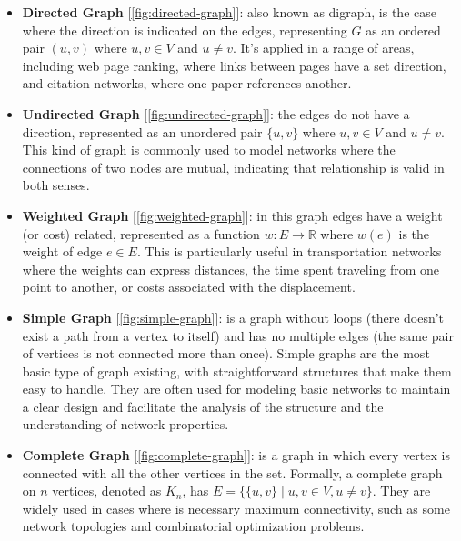 \documentclass[../Thesis.tex]{subfiles}
\begin{document}
	\begin{itemize}
		\item \textbf{Directed Graph} [\autoref{fig:directed-graph}]: also known as digraph, is the case where the direction is indicated on the edges, representing \( G \) as an ordered pair \( (u, v) \) where \( u, v \in V \) and \( u \neq v \). It's applied in a range of areas, including web page ranking, where links between pages have a set direction, and citation networks, where one paper references another.
		
		
		\item \textbf{Undirected Graph} [\autoref{fig:undirected-graph}]: the edges do not have a direction, represented as an unordered pair \( \{u, v\} \) where \( u, v \in V \) and \( u \neq v \). This kind of graph is commonly used to model networks where the connections of two nodes are mutual, indicating that relationship is valid in both senses.
		
		
		\item \textbf{Weighted Graph} [\autoref{fig:weighted-graph}]: in this graph edges have a weight (or cost) related, represented as a function \( w: E \to \mathbb{R} \) where \( w(e) \) is the weight of edge \( e \in E \). This is particularly useful in transportation networks where the weights can express distances, the time spent traveling from one point to another, or costs associated with the displacement.
		
		
		\item \textbf{Simple Graph} [\autoref{fig:simple-graph}]: is a graph without loops (there doesn't exist a path from a vertex to itself) and has no multiple edges (the same pair of vertices is not connected more than once). Simple graphs are the most basic type of graph existing, with straightforward structures that make them easy to handle. They are often used for modeling basic networks to maintain a clear design and facilitate the analysis of the structure and the understanding of network properties. 
		
		
		\item \textbf{Complete Graph} [\autoref{fig:complete-graph}]: is a graph in which every vertex is connected with all the other vertices in the set. Formally, a complete graph on \( n \) vertices, denoted as \( K_n \), has \( E = \{ \{u, v\} \mid u, v \in V, u \neq v \} \). They are widely used in cases where is necessary maximum connectivity, such as some network topologies and combinatorial optimization problems.
		
		

\end{itemize}
\end{document}
